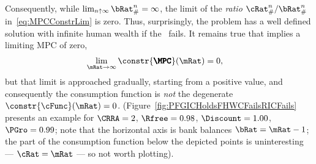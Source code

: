 \documentclass[\econtexRoot/BufferStockTheory]{subfiles}
\begin{document}
Consequently, while $\lim_{n \uparrow \infty} \bRat_{\#}^{n} = \infty$, the limit of the \textit{ratio} $\cRat_{\#}^{n}/\bRat_{\#}^{n}$ in~\eqref{eq:MPCConstrLim} is zero.
Thus, surprisingly, the problem has a well defined solution with
infinite human wealth if the \RIC~fails.  It remains true that \cncl{\RIC}
implies a limiting MPC of zero,
\begin{equation}\begin{gathered}\begin{aligned}
  \lim_{\mRat \rightarrow \infty} \constr{\pmb{\MPC}}(\mRat)   & = 0,
\end{aligned}\end{gathered}\end{equation}
but that limit is approached gradually, starting from a positive value, and consequently the consumption function is \textit{not} the degenerate $\constr{\cFunc}(\mRat)=0$.  (Figure~\ref{fig:PFGICHoldsFHWCFailsRICFails} presents an example for $\CRRA=2$, $\Rfree=0.98$, $\Discount = 1.00$, $\PGro = 0.99$; note that the horizontal axis is bank balances $\bRat = \mRat-1$; the part of the consumption function below the depicted points is uninteresting --- $\cRat = \mRat$ --- so not worth plotting).



\end{document}

